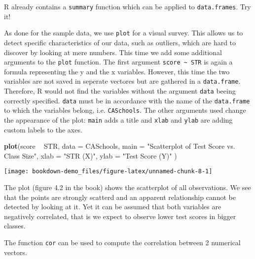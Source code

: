 \documentclass[]{book}
\newenvironment{Shaded}{\begin{snugshade}}{\end{snugshade}}
\newcommand{\KeywordTok}[1]{\textcolor[rgb]{0.13,0.29,0.53}{\textbf{#1}}}
\newcommand{\DataTypeTok}[1]{\textcolor[rgb]{0.13,0.29,0.53}{#1}}
\newcommand{\StringTok}[1]{\textcolor[rgb]{0.31,0.60,0.02}{#1}}
\newcommand{\OperatorTok}[1]{\textcolor[rgb]{0.81,0.36,0.00}{\textbf{#1}}}
\newcommand{\NormalTok}[1]{#1}
\theoremstyle{definition}
\theoremstyle{definition}
\theoremstyle{definition}
\theoremstyle{remark}
\begin{document}
R already contains a \texttt{summary} function which can be applied to
\texttt{data.frames}. Try it!

As done for the sample data, we use \texttt{plot} for a visual survey.
This allows us to detect specific characteristics of our data, such as
outliers, which are hard to discover by looking at mere numbers. This
time we add some additional arguments to the \texttt{plot} function. The
first argument \texttt{score\ \textasciitilde{}\ STR} is again a formula
representing the y and the x variables. However, this time the two
variables are not saved in seperate vectores but are gathered in a
\texttt{data.frame}. Therefore, R would not find the variables without
the argument \texttt{data} beeing correctly specified. \texttt{data}
must be in accordance with the name of the \texttt{data.frame} to which
the variables belong, i.e. \texttt{CASchools}. The other arguments used
change the appearance of the plot: \texttt{main} adds a title and
\texttt{xlab} and \texttt{ylab} are adding custom labels to the axes.

\begin{Shaded}
\begin{Highlighting}[]
\KeywordTok{plot}\NormalTok{(score }\OperatorTok{~}\StringTok{ }\NormalTok{STR, }
     \DataTypeTok{data =}\NormalTok{ CASchools,}
     \DataTypeTok{main =} \StringTok{"Scatterplot of Test Score vs. Class Size"}\NormalTok{, }
     \DataTypeTok{xlab =} \StringTok{"STR (X)"}\NormalTok{,}
     \DataTypeTok{ylab =} \StringTok{"Test Score (Y)"}
\NormalTok{)}
\end{Highlighting}
\end{Shaded}

\begin{center}\texttt{[image: bookdown-demo\_files/figure-latex/unnamed-chunk-8-1]} \end{center}

The plot (figure 4.2 in the book) shows the scatterplot of all
observations. We see that the points are strongly scatterd and an
apparent relationship cannot be detected by looking at it. Yet it can be
assumed that both variables are negatively correlated, that is we expect
to observe lower test scores in bigger classes.

The function \texttt{cor} can be used to compute the correlation between
2 numerical vectors.

\begin{Shaded}
\end{Shaded}
\end{document}
